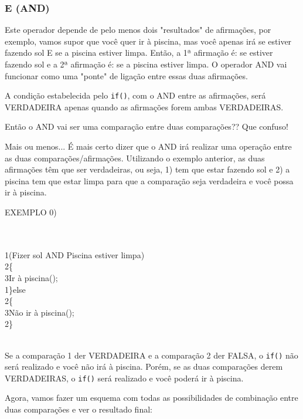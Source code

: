 \documentclass[conference]{IEEEtran}
\begin{document}
\begin{center}
    \subsubsection{E (AND)}
\end{center}
\par
Este operador depende de pelo menos dois "resultados" de afirmações, por exemplo, vamos supor que você quer ir à piscina, mas você apenas irá se estiver fazendo sol E se a piscina estiver limpa. Então, a 1ª afirmação é: se estiver fazendo sol e a 2ª afirmação é: se a piscina estiver limpa. O operador AND vai funcionar como uma "ponte" de ligação entre essas duas afirmações.
\par
A condição estabelecida pelo \texttt{if()}, com o AND entre as afirmações, será VERDADEIRA apenas quando as afirmações forem ambas VERDADEIRAS.
\par
Então o AND vai ser uma comparação entre duas comparações?? Que confuso!
\par
Mais ou menos... É mais certo dizer que o AND irá realizar uma operação entre as duas comparações/afirmações. Utilizando o exemplo anterior, as duas afirmações têm que ser verdadeiras, ou seja, 1) tem que estar fazendo sol e 2) a piscina tem que estar limpa para que a comparação seja verdadeira e você possa ir à piscina.
\\
\begin{center}
    EXEMPLO 0)
\end{center}
\\
\\
{\selectfont 
{\color{cinza}1}(Fizer sol AND Piscina estiver limpa)\\
{\color{cinza}2}\quad\{\\
{\color{cinza}3}\quad\quad Ir à piscina();\\
{\color{cinza}1}\quad\}{\color{verde}else}\\
{\color{cinza}2}\quad\{\\
{\color{cinza}3}\quad\quad Não ir à piscina();\\
{\color{cinza}2}\quad\}\\}
\\
\par
Se a comparação 1 der VERDADEIRA e a comparação 2 der FALSA, o \texttt{if()} não será realizado e você não irá à piscina. Porém, se as duas comparações derem VERDADEIRAS, o \texttt{if()} será realizado e você poderá ir à piscina.
\par
Agora, vamos fazer um esquema com todas as possibilidades de combinação entre duas comparações e ver o resultado final:
\end{document}
